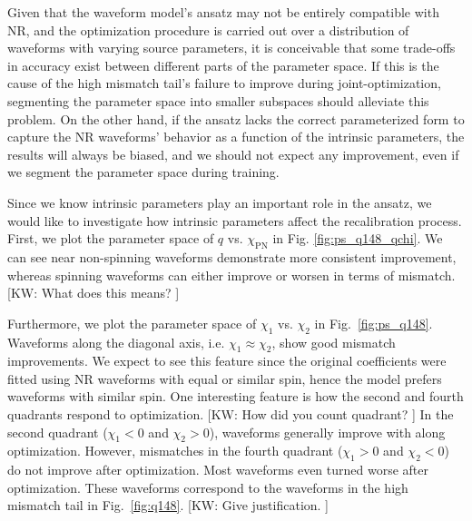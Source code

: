 \documentclass[twocolumn]{aastex631}
\newcommand{\kw}[1]{{\color{rb4}[KW: #1 ]}}
\begin{document}

Given that the waveform model's ansatz may not be entirely compatible with NR,
and the optimization procedure is carried out over a distribution of waveforms
with varying source parameters, it is conceivable that some trade-offs in
accuracy exist between different parts of the parameter space. If this is the
cause of the high mismatch tail's failure to improve during joint-optimization,
segmenting the parameter space into smaller subspaces should alleviate this
problem. On the other hand, if the ansatz lacks the correct parameterized form
to capture the NR waveforms' behavior as a function of the intrinsic parameters,
the results will always be biased, and we should not expect any improvement,
even if we segment the parameter space during training.

Since we know intrinsic parameters play an important role in the ansatz, we
would like to investigate how intrinsic parameters affect the recalibration
process. First, we plot the parameter space of $q$ vs. $\chi_{\mathrm{PN}}$ in
Fig. \ref{fig:ps_q148_qchi}. We can see near non-spinning waveforms demonstrate
more consistent improvement, whereas spinning waveforms can either improve or
worsen in terms of mismatch. \kw{What does this means?}

Furthermore, we plot the parameter space of $\chi_1$ vs. $\chi_2$ in
Fig.~\ref{fig:ps_q148}. Waveforms along the diagonal axis, i.e.
$\chi_1\approx\chi_2$, show good mismatch improvements. We expect to see this
feature since the original coefficients were fitted using NR waveforms with
equal or similar spin, hence the model prefers waveforms with similar spin. One
interesting feature is how the second and fourth quadrants respond to
optimization. \kw{How did you count quadrant?} In the second quadrant ($\chi_1<0$ and $\chi_2>0$), waveforms
generally improve with along optimization. However, mismatches in the fourth
quadrant ($\chi_1>0$ and $\chi_2<0$) do not improve after optimization. Most
waveforms even turned worse after optimization. These waveforms correspond to
the waveforms in the high mismatch tail in Fig.~\ref{fig:q148}. \kw{Give justification.}
\end{document}
